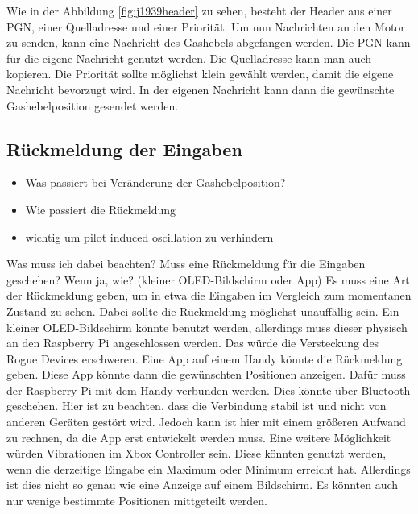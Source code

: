 Wie in der Abbildung \ref{fig:j1939header} zu sehen, besteht der Header aus einer PGN, einer Quelladresse und einer Priorität. Um nun Nachrichten
an den Motor zu senden, kann eine Nachricht des Gashebels abgefangen werden. Die PGN kann für die eigene Nachricht genutzt
werden. Die Quelladresse kann man auch kopieren. Die Priorität sollte möglichst klein gewählt werden, 
damit die eigene Nachricht bevorzugt wird. In der eigenen Nachricht kann dann die gewünschte Gashebelposition gesendet werden.

\subsection{Rückmeldung der Eingaben}
\begin{itemize}
    \item Was passiert bei Veränderung der Gashebelposition?
    \item Wie passiert die Rückmeldung
    \item wichtig um pilot induced oscillation zu verhindern
\end{itemize}
Was muss ich dabei beachten?
Muss eine Rückmeldung für die Eingaben geschehen? Wenn ja, wie?
(kleiner OLED-Bildschirm oder App)
Es muss eine Art der Rückmeldung geben, um in etwa die Eingaben im Vergleich zum momentanen Zustand zu sehen.
Dabei sollte die Rückmeldung möglichst unauffällig sein. Ein kleiner OLED-Bildschirm könnte benutzt werden, allerdings
muss dieser physisch an den Raspberry Pi angeschlossen werden. Das würde die Versteckung des Rogue Devices erschweren.
Eine App auf einem Handy könnte die Rückmeldung geben. Diese App könnte dann die gewünschten Positionen anzeigen.
Dafür muss der Raspberry Pi mit dem Handy verbunden werden. Dies könnte über Bluetooth geschehen.
Hier ist zu beachten, dass die Verbindung stabil ist und nicht von anderen Geräten gestört wird.
Jedoch kann ist hier mit einem größeren Aufwand zu rechnen, da die App erst entwickelt werden muss.
Eine weitere Möglichkeit würden Vibrationen im Xbox Controller sein. Diese könnten genutzt werden, wenn die derzeitige
Eingabe ein Maximum oder Minimum erreicht hat. Allerdings ist dies nicht so genau wie eine Anzeige auf einem Bildschirm.
Es könnten auch nur wenige bestimmte Positionen mittgeteilt werden.